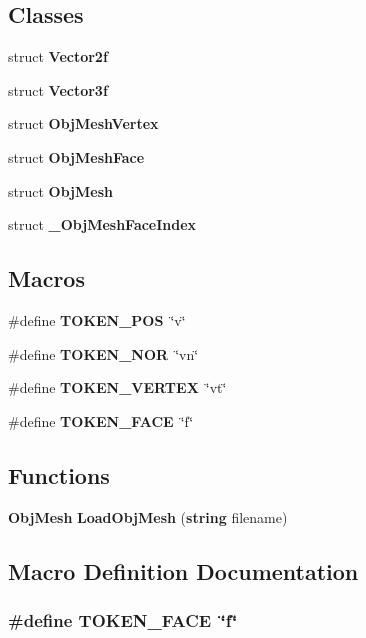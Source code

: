 \subsection*{Classes}
\begin{DoxyCompactItemize}
\item 
struct {\bf Vector2f}
\item 
struct {\bf Vector3f}
\item 
struct {\bf Obj\+Mesh\+Vertex}
\item 
struct {\bf Obj\+Mesh\+Face}
\item 
struct {\bf Obj\+Mesh}
\item 
struct {\bf \+\_\+\+Obj\+Mesh\+Face\+Index}
\end{DoxyCompactItemize}
\subsection*{Macros}
\begin{DoxyCompactItemize}
\item 
\#define {\bf T\+O\+K\+E\+N\+\_\+\+P\+O\+S}~\char`\"{}v\char`\"{}
\item 
\#define {\bf T\+O\+K\+E\+N\+\_\+\+N\+O\+R}~\char`\"{}vn\char`\"{}
\item 
\#define {\bf T\+O\+K\+E\+N\+\_\+\+V\+E\+R\+T\+E\+X}~\char`\"{}vt\char`\"{}
\item 
\#define {\bf T\+O\+K\+E\+N\+\_\+\+F\+A\+C\+E}~\char`\"{}f\char`\"{}
\end{DoxyCompactItemize}
\subsection*{Functions}
\begin{DoxyCompactItemize}
\item 
{\bf Obj\+Mesh} {\bf Load\+Obj\+Mesh} ({\bf string} filename)
\end{DoxyCompactItemize}


\subsection{Macro Definition Documentation}
\subsubsection[{T\+O\+K\+E\+N\+\_\+\+F\+A\+C\+E}]{\setlength{\rightskip}{0pt plus 5cm}\#define T\+O\+K\+E\+N\+\_\+\+F\+A\+C\+E~\char`\"{}f\char`\"{}}\label{_obj_loader_8h_aca39357a463de28dc2d367b2a98d1af2}

